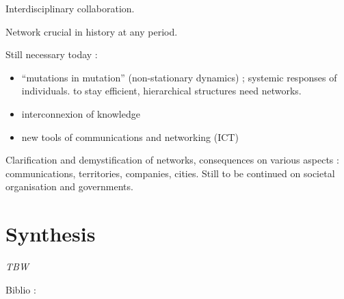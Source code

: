 Interdisciplinary collaboration.

Network crucial in history at any period.

Still necessary today :
\begin{itemize}
\item ``mutations in mutation'' (non-stationary dynamics) ; systemic responses of individuals. to stay efficient, hierarchical structures need networks.
\item interconnexion of knowledge
\item new tools of communications and networking (ICT)
\end{itemize}

Clarification and demystification of networks, consequences on various aspects : communications, territories, companies, cities. Still to be continued on societal organisation and governments.



\section{Synthesis}

\textit{TBW}

Biblio : \cite{dupuy1993geographie}











